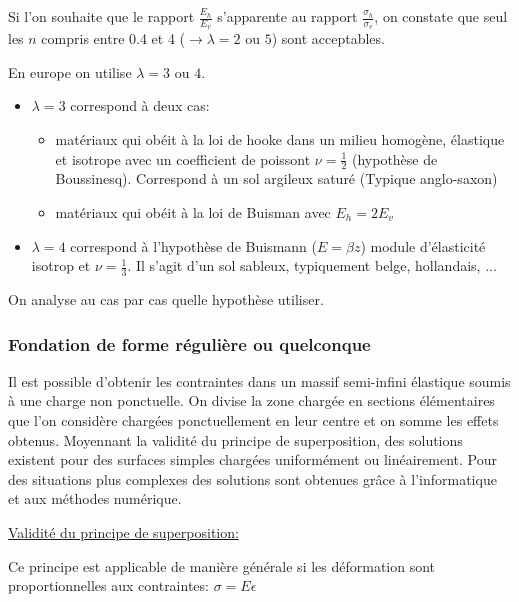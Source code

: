             Si l'on souhaite que le rapport $\frac{E_h}{E_v}$ s'apparente au rapport $\frac{\sigma_h}{\sigma_v}$, on constate que seul les $n$ compris entre 0.4 et 4 ($\to \lambda = 2$ ou $5$) sont acceptables.
            
            En europe on utilise $\lambda = 3$ ou $4$.
            \begin{itemize}
                \item $\lambda = 3$ correspond à deux cas:
                \begin{itemize}
                    \item matériaux qui obéit à la loi de hooke dans un milieu homogène, élastique et isotrope avec un coefficient de poissont $\nu = \frac{1}{2}$ (hypothèse de Boussinesq). Correspond à un sol argileux saturé (Typique anglo-saxon)
                    \item matériaux qui obéit à la loi de Buisman avec $E_h = 2E_v$
                \end{itemize}
                \item $\lambda = 4$ correspond à l'hypothèse de Buismann ($E=\beta z$) module d'élasticité isotrop et $\nu=\frac{1}{3}$. Il s'agit d'un sol sableux, typiquement belge, hollandais, ...
            \end{itemize}
            On analyse au cas par cas quelle hypothèse utiliser.
            
            \subsubsection{Fondation de forme régulière ou quelconque}
            
            Il est possible d'obtenir les contraintes dans un massif semi-infini élastique soumis à une charge non ponctuelle. On divise la zone chargée en sections élémentaires que l'on considère chargées ponctuellement en leur centre et on somme les effets obtenus. Moyennant la validité du principe de superposition, des solutions existent pour des surfaces simples chargées uniformément ou linéairement. Pour des situations plus complexes des solutions sont obtenues grâce à l'informatique et aux méthodes numérique. 
            
            \underline{Validité du principe de superposition:} 
            
            Ce principe est applicable de manière générale si les déformation sont proportionnelles aux contraintes: $\sigma = E \epsilon$
            
